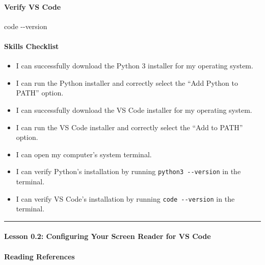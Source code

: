 \documentclass[
  justified,
  openright,
]{tufte-book}
\let\subsection\paragraph
\let\paragraph\paragraph
\newcommand{\CodeTypeTok}[1]{\textcolor{CodeType}{#1}}              %
\newenvironment{Shaded}{%
  \begin{mdframed}[style=TufteCode]%
}{%
  \end{mdframed}%
}
\let\subsection\paragraph
\let\paragraph\paragraph
\providecommand{\tightlist}{%
  \setlength{\itemsep}{0pt}\setlength{\parskip}{0pt}}
\begin{document}
\subsection{Verify VS Code}\label{verify-vs-code}

\begin{Shaded}
\begin{Highlighting}[]
code \CodeTypeTok{{-}{-}version}
\end{Highlighting}
\end{Shaded}

\subsection{Skills Checklist}\label{skills-checklist}

\begin{itemize}
\tightlist
\item[$\square$]
  I can successfully download the Python 3 installer for my operating
  system.
\item[$\square$]
  I can run the Python installer and correctly select the ``Add Python
  to PATH'' option.
\item[$\square$]
  I can successfully download the VS Code installer for my operating
  system.
\item[$\square$]
  I can run the VS Code installer and correctly select the ``Add to
  PATH'' option.
\item[$\square$]
  I can open my computer's system terminal.
\item[$\square$]
  I can verify Python's installation by running
  \texttt{python3\ -\/-version} in the terminal.
\item[$\square$]
  I can verify VS Code's installation by running
  \texttt{code\ -\/-version} in the terminal.
\end{itemize}

\begin{center}\rule{0.5\linewidth}{0.5pt}\end{center}

\subsection{Lesson 0.2: Configuring Your Screen Reader for VS
Code}\label{lesson-0.2-configuring-your-screen-reader-for-vs-code-1}

\subsection{Reading References}\label{reading-references-1}
\end{document}
